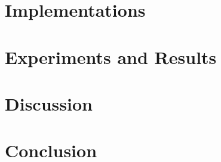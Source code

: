 \documentclass[10pt,twocolumn,letterpaper]{article}
\begin{document}
	\section{Implementations \label{sec:Impl}}
	
	
	\section{Experiments and Results \label{sec:Res}}
	
	
	\section{Discussion \label{sec:Disc}}
	
	
	\section{Conclusion \label{sec:Conc}}
	
	{\small
		
		
	}
	
\end{document}

